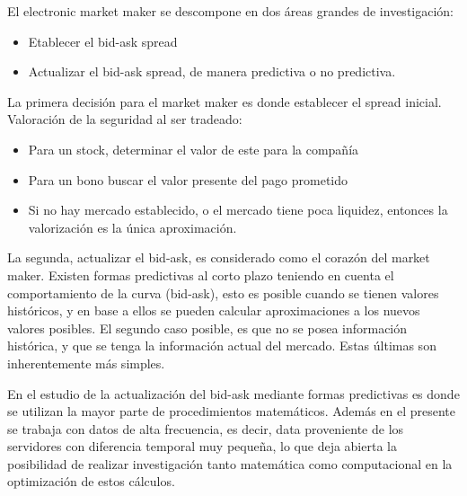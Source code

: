 El electronic market maker se descompone en dos áreas grandes de investigación:
\begin{itemize}
	\item Etablecer el bid-ask spread
	\item Actualizar el bid-ask spread, de manera predictiva o no predictiva.
\end{itemize}
La primera decisión para el market maker es donde establecer el spread inicial. Valoración de la seguridad al ser tradeado:
\begin{itemize}
	\item Para un stock, determinar el valor de este para la compañía
	\item Para un bono buscar el valor presente del pago prometido
	\item Si no hay mercado establecido, o el mercado tiene poca liquidez, entonces la valorización es la única aproximación. \cite{seppi1997liquidity}
\end{itemize}
La segunda, actualizar el bid-ask, es considerado como el corazón del market maker. Existen formas predictivas al corto plazo teniendo en cuenta el comportamiento 
de la curva (bid-ask), esto es posible cuando se tienen valores históricos, y en base a ellos se pueden calcular aproximaciones a los nuevos valores posibles. 
El segundo caso posible, es que no se posea información histórica, y que se tenga la información actual del mercado. Estas últimas son inherentemente más simples.

En el estudio de la actualización del bid-ask mediante formas predictivas es donde se utilizan la mayor parte de procedimientos matemáticos. Además en el presente
se trabaja con datos de alta frecuencia, es decir, data proveniente de los servidores con diferencia temporal muy pequeña, lo que deja abierta la posibilidad
de realizar investigación tanto matemática como computacional en la optimización de estos cálculos.
